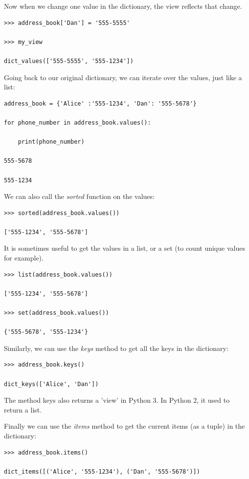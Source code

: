 \documentclass{article}
\begin{document}
Now when we change one value in the dictionary, the view reflects that change.

\begin{lstlisting}
>>> address_book['Dan'] = '555-5555'

>>> my_view

dict_values(['555-5555', '555-1234'])
\end{lstlisting}

Going back to our original dictionary, we can iterate over the values, just like a list:

\begin{lstlisting}
address_book = {'Alice' :'555-1234', 'Dan': '555-5678'}

for phone_number in address_book.values():

    print(phone_number)    

555-5678

555-1234
\end{lstlisting}

We can also call the \textit{sorted} function on the values:

\begin{lstlisting}
>>> sorted(address_book.values())

['555-1234', '555-5678']
\end{lstlisting}

It is sometimes useful to get the values in a list, or a set (to count unique values for example).

\begin{lstlisting}
>>> list(address_book.values())

['555-1234', '555-5678']

>>> set(address_book.values())

{'555-5678', '555-1234'}
\end{lstlisting}

Similarly, we can use the \textit{keys} method to get all the keys in the dictionary:

\begin{lstlisting}
>>> address_book.keys()

dict_keys(['Alice', 'Dan'])
\end{lstlisting}

The method keys also returns a 'view' in Python 3.  In Python 2, it used to return a list.

Finally we can use the \textit{items} method to get the current items (as a tuple) in the dictionary:

\begin{lstlisting}
>>> address_book.items()

dict_items([('Alice', '555-1234'), ('Dan', '555-5678')])
\end{lstlisting}
\end{document}
